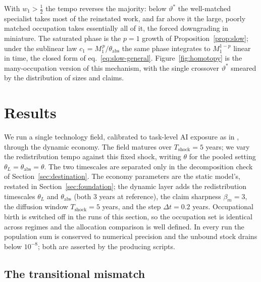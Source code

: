 \documentclass[12pt, a4paper]{article}
\begin{document}
With $w_1 > \tfrac12$ the tempo reverses the majority: below $\vartheta^*$
the well-matched specialist takes most of the reinstated work, and far
above it the large, poorly matched occupation takes essentially all of
it, the forced downgrading in miniature. The saturated phase is the
$p = 1$ growth of Proposition~\ref{prop:slow}; under the sublinear law
$c_1 = M_1^{\,p}/\theta_{\text{abs}}$ the same phase integrates to
$M_1^{1-p}$ linear in time, the closed form of
eq.~\eqref{eq:slow-general}. Figure~\ref{fig:homotopy} is the
many-occupation version of this mechanism, with the single crossover
$\vartheta^*$ smeared by the distribution of sizes and claims.

\section{Results}
\label{sec:results}

We run a single technology field, calibrated to task-level AI exposure as
in \textcite{storck2026fields}, through the dynamic economy. The field matures
over $T_{\text{shock}}=5$ years; we vary the redistribution tempo
against this fixed shock, writing $\theta$ for the pooled setting
$\theta_L = \theta_{\text{abs}} = \theta$. The two timescales are
separated only in the decomposition check of
Section~\ref{sec:destination}. The economy parameters are the static model's,
restated in Section~\ref{sec:foundation}; the dynamic layer adds the
redistribution timescales $\theta_L$ and $\theta_{\text{abs}}$ (both
$3$ years at reference), the claim sharpness $\beta_m = 3$, the diffusion
window $T_{\text{shock}} = 5$ years, and the step $\Delta t = 0.2$ years.
Occupational birth is switched off in the runs of this section, so the
occupation set is identical across regimes and the allocation comparison
is well defined. In every run the population sum is conserved to
numerical precision and the unbound stock drains below $10^{-8}$; both
are asserted by the producing scripts.

\subsection{The transitional mismatch}
\label{sec:transitional}
\end{document}
